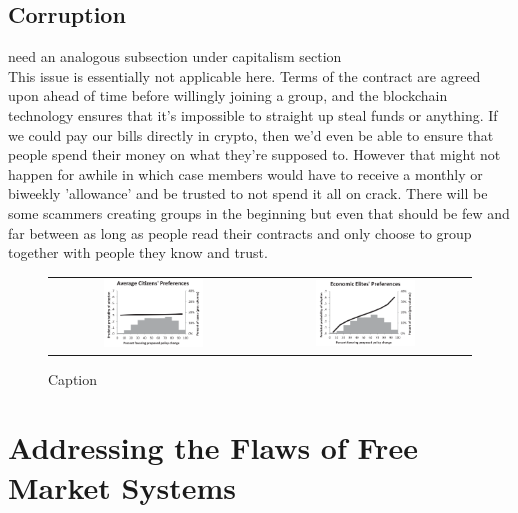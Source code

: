 \documentclass{article}[10pt]
\begin{document}
\subsection{Corruption} 
need an analogous subsection under capitalism section \\
This issue is essentially not applicable here. 
Terms of the contract are agreed upon ahead of time before willingly joining a group, and the blockchain technology ensures that it's impossible to straight up steal funds or anything.
If we could pay our bills directly in crypto, then we'd even be able to ensure that people spend their money on what they're supposed to.
However that might not happen for awhile in which case members would have to receive a monthly or biweekly 'allowance' and be trusted to not spend it all on crack. 
There will be some scammers creating groups in the beginning but even that should be few and far between as long as people read their contracts and only choose to group together with people they know and trust. 

\begin{figure}
    \centering
\begin{tabular}{cc}
   \includegraphics[width=0.5\textwidth]{figures/Capture.PNG}  & \includegraphics[width=0.5\textwidth]{figures/Capture2.PNG} \\
\end{tabular}
    \caption{Caption\autocite{gilens2014testing}}
    \label{fig:my_label}
\end{figure}


\section{Addressing the Flaws of Free Market Systems}
\label{section:FreeFlaws}
\end{document}
